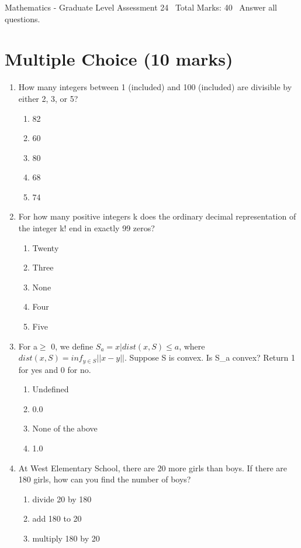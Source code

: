 \documentclass[12pt]{article}
\begin{document}
\begin{center}
Mathematics - Graduate Level Assessment 24 \
Total Marks: 40 \
Answer all questions.
\end{center}

\section*{Multiple Choice (10 marks)}
\begin{enumerate}[label=\arabic*.]
\item How many integers between 1 (included) and 100 (included) are divisible by either 2, 3, or 5?
\begin{enumerate}[label=(\alph*)]
    \item 82
    \item 60
    \item 80
    \item 68
    \item 74
\end{enumerate}
\item For how many positive integers k does the ordinary decimal representation of the integer k! end in exactly 99 zeros?
\begin{enumerate}[label=(\alph*)]
    \item Twenty
    \item Three
    \item None
    \item Four
    \item Five
\end{enumerate}
\item For a\ensuremath{\geq} 0, we define $S_a={x | dist(x, S) \leq a}$, where $dist(x,S)=inf_{y\in S}||x-y||$. Suppose S is convex. Is S\_a convex? Return 1 for yes and 0 for no.
\begin{enumerate}[label=(\alph*)]
    \item Undefined
    \item 0.0
    \item None of the above
    \item 1.0
\end{enumerate}
\item At West Elementary School, there are 20 more girls than boys. If there are 180 girls, how can you find the number of boys?
\begin{enumerate}[label=(\alph*)]
    \item divide 20 by 180
    \item add 180 to 20
    \item multiply 180 by 20

\end{enumerate}
\end{enumerate}
\end{document}
